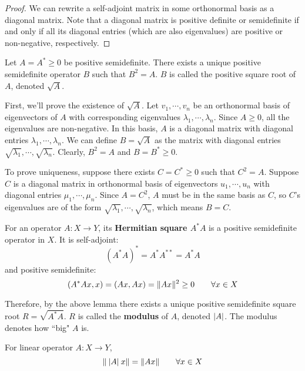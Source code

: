 \begin{proof}
We can rewrite a self-adjoint matrix in some orthonormal basis as a diagonal matrix. Note that a diagonal matrix is positive definite or semidefinite if and only if all its diagonal entries (which are also eigenvalues) are positive or non-negative, respectively.  
\end{proof}

\begin{lemma}
Let $A = A^{*} \geq 0$ be positive semidefinite. There exists a unique positive semidefinite operator $B$ such that $B^{2} = A$. $B$ is called the positive square root of $A$, denoted $\sqrt{A}$.
\end{lemma}

\begin{lproof}
First, we'll prove the existence of $\sqrt{A}$. Let $v_{1}, \cdots, v_{n}$ be an orthonormal basis of eigenvectors of $A$ with corresponding eigenvalues $\lambda_{1}, \cdots, \lambda_{n}$. Since $A \geq 0$, all the eigenvalues are non-negative. In this basis, $A$ is a diagonal matrix with diagonal entries $\lambda_{1}, \cdots, \lambda_{n}$. We can define $B =\sqrt{A}$ as the matrix with diagonal entries $\sqrt{\lambda_{1}}, \cdots, \sqrt{\lambda_{n}}$. Clearly, $B^{2} = A$ and $B = B^{*} \geq 0$. 

To prove uniqueness, suppose there exists $C = C^{*} \geq 0$ such that $C^{2} = A$. Suppose $C$ is a diagonal matrix in orthonormal basis of eigenvectors $u_{1}, \cdots, u_{n}$ with diagonal entries $\mu_{1}, \cdots, \mu_{n}$. Since $A = C^{2}$, $A$ must be in the same basis as $C$, so $C$'s eigenvalues are of the form $\sqrt{\lambda_{1}}, \cdots, \sqrt{\lambda_{n}}$, which means $B = C$. 
\end{lproof}

\begin{definition}
For an operator $A: X \rightarrow Y$, its \textbf{Hermitian square $A^{*} A$} is a positive semidefinite operator in $X$. It is self-adjoint:
$$(A^{*} A)^{*} = A^{*} A^{**} = A^{*} A$$
and positive semidefinite:
$$(A^{*} Ax, x) = (Ax, Ax) = \lVert Ax\rVert^{2} \geq 0 \qquad \forall x \in X$$

Therefore, by the above lemma there exists a unique positive semidefinite square root $R = \sqrt{A^{*} A}$. $R$ is called the \textbf{modulus} of $A$, denoted $\lvert A\rvert$. The modulus denotes how ``big" $A$ is. 
\end{definition}

\begin{theorem}
For linear operator $A: X \rightarrow Y$, 
$$\lVert\: \lvert A\rvert \: x\rVert = \lVert Ax\rVert \qquad \forall x \in X$$ 
\end{theorem}

